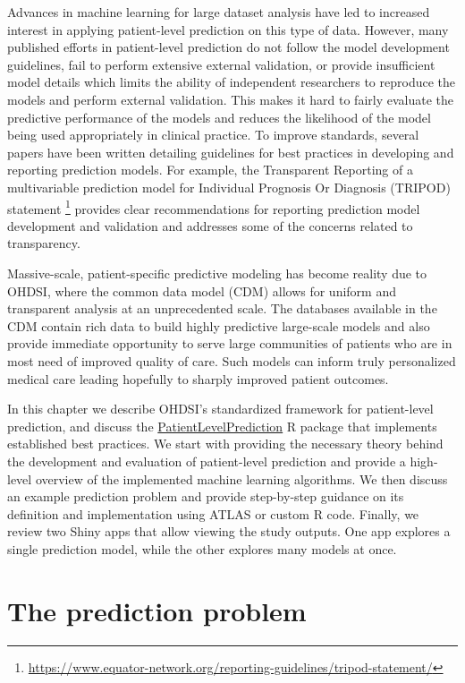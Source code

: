 \documentclass[11pt]{book}
\let\rmarkdownfootnote\footnote%
\def\footnote{\protect\rmarkdownfootnote}
\theoremstyle{definition}
\theoremstyle{definition}
\theoremstyle{definition}
\theoremstyle{remark}
\begin{document}
Advances in machine learning for large dataset analysis have led to increased interest in applying patient-level prediction on this type of data. However, many published efforts in patient-level prediction do not follow the model development guidelines, fail to perform extensive external validation, or provide insufficient model details which limits the ability of independent researchers to reproduce the models and perform external validation. This makes it hard to fairly evaluate the predictive performance of the models and reduces the likelihood of the model being used appropriately in clinical practice. To improve standards, several papers have been written detailing guidelines for best practices in developing and reporting prediction models. For example, the Transparent Reporting of a multivariable prediction model for Individual Prognosis Or Diagnosis (TRIPOD) statement \footnote{\url{https://www.equator-network.org/reporting-guidelines/tripod-statement/}} provides clear recommendations for reporting prediction model development and validation and addresses some of the concerns related to transparency.

Massive-scale, patient-specific predictive modeling has become reality due to OHDSI, where the common data model (CDM) allows for uniform and transparent analysis at an unprecedented scale. The databases available in the CDM contain rich data to build highly predictive large-scale models and also provide immediate opportunity to serve large communities of patients who are in most need of improved quality of care. Such models can inform truly personalized medical care leading hopefully to sharply improved patient outcomes.

In this chapter we describe OHDSI's standardized framework for patient-level prediction, \citep{reps2018} and discuss the \href{https://ohdsi.github.io/PatientLevelPrediction/}{PatientLevelPrediction} R package that implements established best practices. We start with providing the necessary theory behind the development and evaluation of patient-level prediction and provide a high-level overview of the implemented machine learning algorithms. We then discuss an example prediction problem and provide step-by-step guidance on its definition and implementation using ATLAS or custom R code. Finally, we review two Shiny apps that allow viewing the study outputs. One app explores a single prediction model, while the other explores many models at once.

\hypertarget{the-prediction-problem}{%
\section{The prediction problem}\label{the-prediction-problem}}
\end{document}
